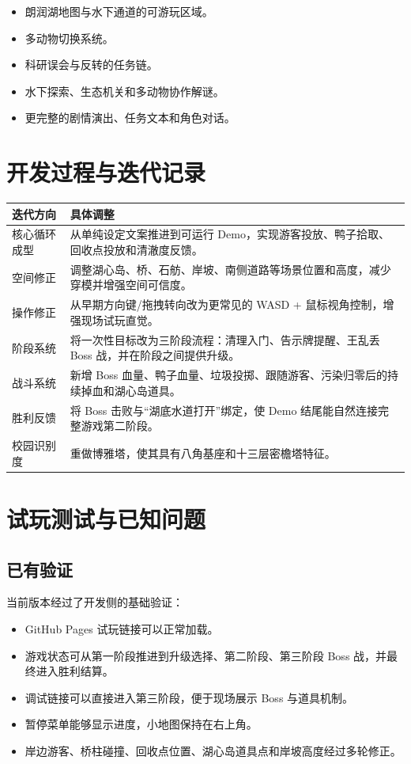 \documentclass[UTF8,a4paper,12pt]{ctexart}
\begin{document}
\begin{itemize}
  \item 朗润湖地图与水下通道的可游玩区域。
  \item 多动物切换系统。
  \item 科研误会与反转的任务链。
  \item 水下探索、生态机关和多动物协作解谜。
  \item 更完整的剧情演出、任务文本和角色对话。
\end{itemize}

\section{开发过程与迭代记录}

\begin{longtable}{p{3cm}p{10.8cm}}
\toprule
迭代方向 & 具体调整 \\
\midrule
\endhead
核心循环成型 & 从单纯设定文案推进到可运行 Demo，实现游客投放、鸭子拾取、回收点投放和清澈度反馈。 \\
空间修正 & 调整湖心岛、桥、石舫、岸坡、南侧道路等场景位置和高度，减少穿模并增强空间可信度。 \\
操作修正 & 从早期方向键/拖拽转向改为更常见的 WASD + 鼠标视角控制，增强现场试玩直觉。 \\
阶段系统 & 将一次性目标改为三阶段流程：清理入门、告示牌提醒、王乱丢 Boss 战，并在阶段之间提供升级。 \\
战斗系统 & 新增 Boss 血量、鸭子血量、垃圾投掷、跟随游客、污染归零后的持续掉血和湖心岛道具。 \\
胜利反馈 & 将 Boss 击败与``湖底水道打开''绑定，使 Demo 结尾能自然连接完整游戏第二阶段。 \\
校园识别度 & 重做博雅塔，使其具有八角基座和十三层密檐塔特征。 \\
\bottomrule
\end{longtable}

\section{试玩测试与已知问题}

\subsection{已有验证}

当前版本经过了开发侧的基础验证：

\begin{itemize}
  \item GitHub Pages 试玩链接可以正常加载。
  \item 游戏状态可从第一阶段推进到升级选择、第二阶段、第三阶段 Boss 战，并最终进入胜利结算。
  \item 调试链接可以直接进入第三阶段，便于现场展示 Boss 与道具机制。
  \item 暂停菜单能够显示进度，小地图保持在右上角。
  \item 岸边游客、桥柱碰撞、回收点位置、湖心岛道具点和岸坡高度经过多轮修正。
\end{itemize}
\end{document}
